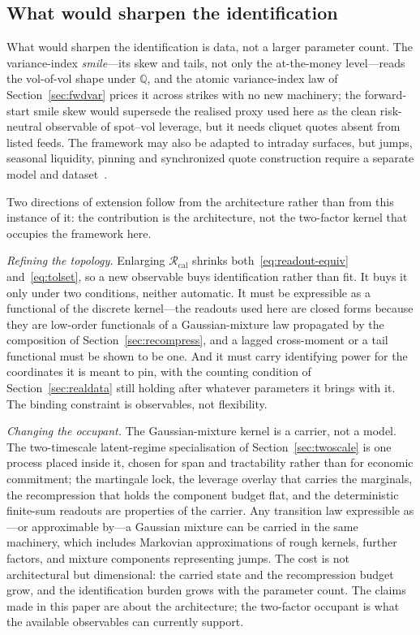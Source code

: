 \documentclass[11pt]{article}
\providecommand{\Rcal}{\mathcal R}
\providecommand{\1}{\mathbf 1}
\begin{document}
\subsection{What would sharpen the identification}

What would sharpen the identification is data, not a larger parameter count. The variance-index
\emph{smile}---its skew and tails, not only the at-the-money level---reads the vol-of-vol shape under
$\mathbb Q$, and the atomic variance-index law of Section~\ref{sec:fwdvar} prices it across strikes with
no new machinery; the forward-start smile skew would supersede the realised proxy used here as the
clean risk-neutral observable of spot--vol leverage, but it needs cliquet quotes absent from listed
feeds. The framework may also be adapted to intraday surfaces, but jumps, seasonal liquidity, pinning
and synchronized quote construction require a separate model and dataset~\cite{bandi2026}.

Two directions of extension follow from the architecture rather than from this instance of it: the
contribution is the architecture, not the two-factor kernel that
occupies the framework here.

\emph{Refining the topology.} Enlarging $\Rcal_{\mathrm{cal}}$ shrinks
both~\eqref{eq:readout-equiv} and~\eqref{eq:tolset}, so a new observable buys identification rather
than fit. It buys it only under two conditions, neither
automatic. It must be expressible as a functional of the discrete kernel---the readouts used here
are closed forms because they are low-order functionals of a Gaussian-mixture law propagated by the
composition of Section~\ref{sec:recompress}, and a lagged cross-moment or a tail functional must be
shown to be one. And it must carry identifying power for the coordinates it is meant to pin, with
the counting condition of Section~\ref{sec:realdata} still holding after whatever parameters it
brings with it. The binding constraint is observables, not flexibility.

\emph{Changing the occupant.} The Gaussian-mixture kernel is a carrier, not a model. The
two-timescale latent-regime specialisation of Section~\ref{sec:twoscale} is one process placed inside
it, chosen for span and tractability rather than for economic commitment; the martingale lock, the
leverage overlay that carries the marginals, the recompression that holds the component budget flat,
and the deterministic finite-sum readouts are properties of the carrier. Any transition law expressible as---or
approximable by---a Gaussian mixture can be carried in the same machinery, which includes Markovian
approximations of rough kernels, further factors, and mixture components representing jumps. The cost
is not architectural but dimensional: the carried state and the recompression budget grow, and the
identification burden grows with the parameter count. The claims made in this paper are about the
architecture; the two-factor occupant is what the available observables can currently support.
\end{document}
